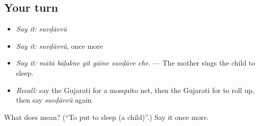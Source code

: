 \subsection*{Your turn}
\begin{itemize}
\raggedright
  \item \emph{Say it:} \emph{suvḍāvvũ}
  \item \emph{Say it:} \emph{suvḍāvvũ}, once more
  \item \emph{Say it:} \emph{mātā bāḷakne gīt gāīne suvḍāve che.} — The mother sings the child to sleep.
  \item \emph{Recall:} say the Gujarati for a mosquito net, then the Gujarati for to roll up, then say \emph{suvḍāvvũ} again
\end{itemize}

\begin{tcolorbox}[breakable,colback=teal!4,colframe=teal!35!black,title={Before you move on}]
What does  mean? (\textquotedblleft{}To put to sleep (a child)\textquotedblright{}.) Say it once more.
\end{tcolorbox}
